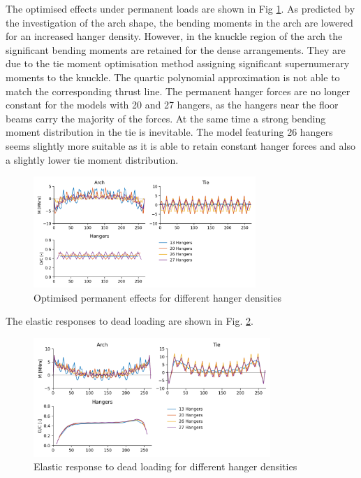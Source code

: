 The optimised effects under permanent loads are shown in Fig \ref{fig:hd_permanent}. As predicted by the investigation of the arch shape, the bending moments in the arch are lowered for an increased hanger density. However, in the knuckle region of the arch the significant bending moments are retained for the dense arrangements. They are due to the tie moment optimisation method assigning significant supernumerary moments to the knuckle. The quartic polynomial approximation is not able to match the corresponding thrust line. The permanent hanger forces are no longer constant for the models with 20 and 27 hangers, as the hangers near the floor beams carry the majority of the forces. At the same time a strong bending moment distribution in the tie is inevitable. The model featuring 26 hangers seems slightly more suitable as it is able to retain constant hanger forces and also a slightly lower tie moment distribution.

\begin{figure}[H]
    \centering
    \includegraphics[width=0.75\textwidth]{calculations/hanger amount comparison/permanent state.png}
    \caption{Optimised permanent effects for different hanger densities}
    \label{fig:hd_permanent}
\end{figure}

The elastic responses to dead loading are shown in Fig. \ref{fig:hd_elastic_response_dl}.

\begin{figure}[H]
    \centering
    \includegraphics[width=0.8\textwidth]{calculations/hanger amount comparison/dead load.png}
    \caption{Elastic response to dead loading for different hanger densities}
    \label{fig:hd_elastic_response_dl}
\end{figure}

